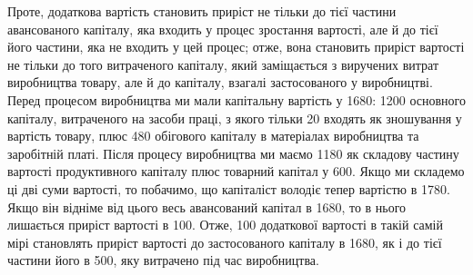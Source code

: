 Проте, додаткова вартість становить приріст не тільки до
тієї частини авансованого капіталу, яка входить у процес зростання
вартості, але й до тієї його частини, яка не входить у цей
процес; отже, вона становить приріст вартості не тільки до того
витраченого капіталу, який заміщається з виручених витрат виробництва
товару, але й до капіталу, взагалі застосованого у виробництві.
Перед процесом виробництва ми мали капітальну
вартість у 1680: 1200 основного
капіталу, витраченого на засоби праці, з якого тільки
20 входять як зношування у вартість товару,
плюс 480 обігового капіталу в матеріалах виробництва
та заробітній платі. Після процесу виробництва ми
маємо 1180 як складову частину вартості
продуктивного капіталу плюс товарний капітал у 600. Якщо ми складемо ці дві суми вартості, то побачимо,
що капіталіст володіє тепер вартістю в 1780.
Якщо він відніме від цього весь авансований капітал в 1680, то в нього лишається приріст вартості в 100. Отже, 100 додаткової вартості
в такій самій мірі становлять приріст вартості до застосованого
капіталу в 1680, як і до тієї частини
його в 500, яку витрачено під час виробництва.
